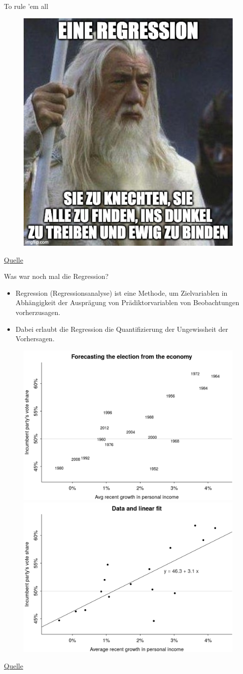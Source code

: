 \documentclass[
  ngerman,
  ignorenonframetext,
]{beamer}
\begin{document}
\begin{frame}{To rule 'em all}
\protect\hypertarget{to-rule-em-all}{}
\begin{figure}[H]

{\centering \includegraphics[width=0.5\linewidth]{img/einring} 

}

\end{figure}

\href{https://imgflip.com/i/5m9qrp}{Quelle}
\end{frame}

\begin{frame}{Was war noch mal die Regression?}
\protect\hypertarget{was-war-noch-mal-die-regression}{}
\begin{itemize}
\item
  Regression (Regressionsanalyse) ist eine Methode, um Zielvariablen in
  Abhängigkeit der Ausprägung von Prädiktorvariablen von Beobachtungen
  vorherzusagen.
\item
  Dabei erlaubt die Regression die Quantifizierung der Ungewissheit der
  Vorhersagen.
\end{itemize}

\begin{figure}[H]
\includegraphics[width=0.4\linewidth]{img/fig1-1a} \includegraphics[width=0.4\linewidth]{img/fig1-1b} \end{figure}

\href{https://avehtari.github.io/ROS-Examples/ElectionsEconomy/hibbs.html}{Quelle}
\end{frame}
\end{document}
